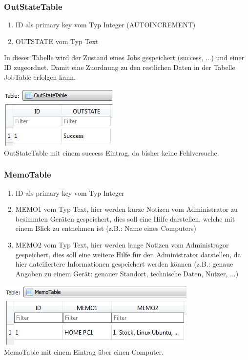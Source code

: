 \documentclass[12pt,a4paper]{report}
\begin{document}
\begin{onehalfspace}
\subsubsection{OutStateTable}
\begin{enumerate}
\item ID als primary key vom Typ Integer (AUTOINCREMENT)
\item OUTSTATE vom Typ Text
\end{enumerate}
In dieser Tabelle wird der Zustand eines Jobs gespeichert (success, ...) und einer ID zugeordnet. Damit eine Zuordnung zu den restlichen Daten in der Tabelle JobTable erfolgen kann.
\begin{center}
\includegraphics[scale=0.8]{img/db-tb-out.png}\\
OutStateTable mit einem success Eintrag, da bisher keine Fehlversuche.
\end{center}
\subsubsection{MemoTable}
\begin{enumerate}
\item ID als primary key vom Typ Integer
\item MEMO1 vom Typ Text, hier werden kurze Notizen vom Administrator zu besimmten Geräten gespeichert, dies soll eine Hilfe darstellen, welche mit einem Blick zu entnehmen ist (z.B.: Name eines Computers)
\item MEMO2 vom Typ Text, hier werden lange Notizen vom Administragor gespeichert, dies soll eine weitere Hilfe für den Administrator darstellen, da hier dateiliertere Informationen gespeichert werden können (z.B.: genaue Angaben zu einem Gerät: genauer Standort, technische Daten, Nutzer, ...)
\end{enumerate}
\begin{center}
\includegraphics[scale=0.8]{img/db-tb-memo.png}\\
MemoTable mit einem Eintrag über einen Computer.
\end{center}

\end{onehalfspace}
\end{document}
